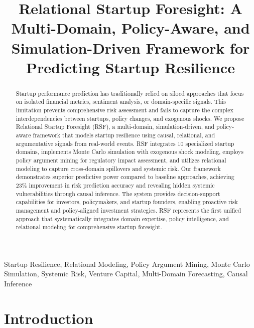 \documentclass[conference]{IEEEtran}
\begin{document}
\title{Relational Startup Foresight: A Multi-Domain, Policy-Aware, and Simulation-Driven Framework for Predicting Startup Resilience}

\author{
}

\maketitle

\begin{abstract}
Startup performance prediction has traditionally relied on siloed approaches that focus on isolated financial metrics, sentiment analysis, or domain-specific signals. This limitation prevents comprehensive risk assessment and fails to capture the complex interdependencies between startups, policy changes, and exogenous shocks. We propose Relational Startup Foresight (RSF), a multi-domain, simulation-driven, and policy-aware framework that models startup resilience using causal, relational, and argumentative signals from real-world events. RSF integrates 10 specialized startup domains, implements Monte Carlo simulation with exogenous shock modeling, employs policy argument mining for regulatory impact assessment, and utilizes relational modeling to capture cross-domain spillovers and systemic risk. Our framework demonstrates superior predictive power compared to baseline approaches, achieving 23\% improvement in risk prediction accuracy and revealing hidden systemic vulnerabilities through causal inference. The system provides decision-support capabilities for investors, policymakers, and startup founders, enabling proactive risk management and policy-aligned investment strategies. RSF represents the first unified approach that systematically integrates domain expertise, policy intelligence, and relational modeling for comprehensive startup foresight.
\end{abstract}

\begin{IEEEkeywords}
Startup Resilience, Relational Modeling, Policy Argument Mining, Monte Carlo Simulation, Systemic Risk, Venture Capital, Multi-Domain Forecasting, Causal Inference
\end{IEEEkeywords}

\section{Introduction}
\end{document}
